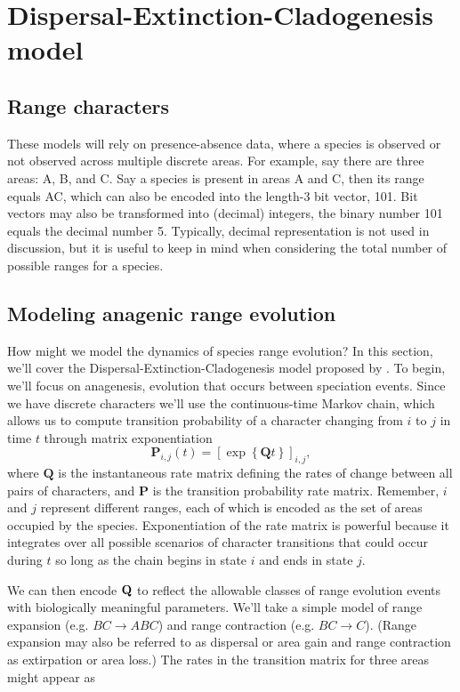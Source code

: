 \section{Dispersal-Extinction-Cladogenesis model}

\subsection{Range characters}

These models will rely on presence-absence data, where a species is observed or not observed across multiple discrete areas.
For example, say there are three areas: A, B, and C.
Say a species is present in areas A and C, then its range equals AC, which can also be encoded into the length-3 bit vector, 101.
Bit vectors may also be transformed into (decimal) integers, \EG the binary number 101 equals the decimal number 5.
Typically, decimal representation is not used in discussion, but it is useful to keep in mind when considering the total number of possible ranges for a species.

\subsection{Modeling anagenic range evolution}

How might we model the dynamics of species range evolution?
In this section, we'll cover the Dispersal-Extinction-Cladogenesis model proposed by \citet{ree05}.
To begin, we'll focus on anagenesis, evolution that occurs between speciation events.
Since we have discrete characters we'll use the continuous-time Markov chain, which allows us to compute transition probability of a character changing from $i$ to $j$ in time $t$ through matrix exponentiation
\[
\mathbf{P}_{i,j}(t) = \left[ \exp \left\lbrace \mathbf{Q}t \right\rbrace \right]_{i,j},
\]
where $\textbf{Q}$ is the instantaneous rate matrix defining the rates of change between all pairs of characters, and $\textbf{P}$ is the transition probability rate matrix.
Remember, $i$ and $j$ represent different ranges, each of which is encoded as the set of areas occupied by the species.
Exponentiation of the rate matrix is powerful because it integrates over all possible scenarios of character transitions that could occur during $t$ so long as the chain begins in state $i$ and ends in state $j$.

We can then encode ${\bf Q}$ to reflect the allowable classes of range evolution events with biologically meaningful parameters.
We'll take a simple model of range expansion (e.g. $BC \rightarrow ABC$) and range contraction (e.g. $BC \rightarrow C$).
(Range expansion may also be referred to as dispersal or area gain and range contraction as extirpation or area loss.)
The rates in the transition matrix for three areas might appear as


